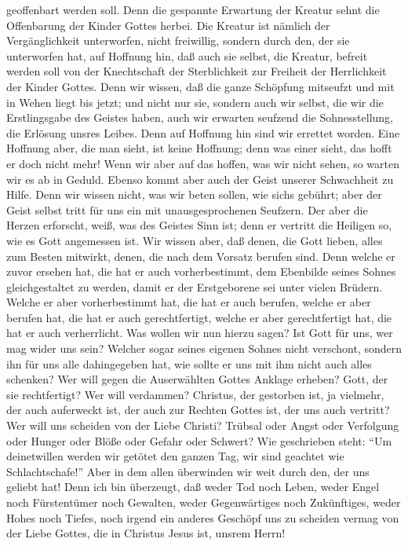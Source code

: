 geoffenbart werden soll.  Denn die gespannte Erwartung
der Kreatur sehnt die Offenbarung der Kinder Gottes herbei.
 Die Kreatur ist nämlich der Vergänglichkeit unterworfen,
nicht freiwillig, sondern durch den, der sie unterworfen hat, auf
Hoffnung hin,  daß auch sie selbst, die Kreatur, befreit
werden soll von der Knechtschaft der Sterblichkeit zur Freiheit der
Herrlichkeit der Kinder Gottes.  Denn wir wissen, daß die
ganze Schöpfung mitseufzt und mit in Wehen liegt bis jetzt;
 und nicht nur sie, sondern auch wir selbst, die wir die
Erstlingsgabe des Geistes haben, auch wir erwarten seufzend die
Sohnesstellung, die Erlösung unsres Leibes.  Denn auf
Hoffnung hin sind wir errettet worden. Eine Hoffnung aber, die man
sieht, ist keine Hoffnung; denn was einer sieht, das hofft er doch nicht
mehr!  Wenn wir aber auf das hoffen, was wir nicht sehen,
so warten wir es ab in Geduld.  Ebenso kommt aber auch
der Geist unserer Schwachheit zu Hilfe. Denn wir wissen nicht, was wir
beten sollen, wie sich\textquotesingle s gebührt; aber der Geist selbst
tritt für uns ein mit unausgesprochenen Seufzern.  Der
aber die Herzen erforscht, weiß, was des Geistes Sinn ist; denn er
vertritt die Heiligen so, wie es Gott angemessen ist. 
Wir wissen aber, daß denen, die Gott lieben, alles zum Besten mitwirkt,
denen, die nach dem Vorsatz berufen sind.  Denn welche er
zuvor ersehen hat, die hat er auch vorherbestimmt, dem Ebenbilde seines
Sohnes gleichgestaltet zu werden, damit er der Erstgeborene sei unter
vielen Brüdern.  Welche er aber vorherbestimmt hat, die
hat er auch berufen, welche er aber berufen hat, die hat er auch
gerechtfertigt, welche er aber gerechtfertigt hat, die hat er auch
verherrlicht.  Was wollen wir nun hierzu sagen? Ist Gott
für uns, wer mag wider uns sein?  Welcher sogar seines
eigenen Sohnes nicht verschont, sondern ihn für uns alle dahingegeben
hat, wie sollte er uns mit ihm nicht auch alles schenken?
 Wer will gegen die Auserwählten Gottes Anklage erheben?
Gott, der sie rechtfertigt?  Wer will verdammen?
Christus, der gestorben ist, ja vielmehr, der auch auferweckt ist, der
auch zur Rechten Gottes ist, der uns auch vertritt?  Wer
will uns scheiden von der Liebe Christi? Trübsal oder Angst oder
Verfolgung oder Hunger oder Blöße oder Gefahr oder Schwert?
 Wie geschrieben steht: ``Um deinetwillen werden wir
getötet den ganzen Tag, wir sind geachtet wie Schlachtschafe!''
 Aber in dem allen überwinden wir weit durch den, der uns
geliebt hat!  Denn ich bin überzeugt, daß weder Tod noch
Leben, weder Engel noch Fürstentümer noch Gewalten, weder Gegenwärtiges
noch Zukünftiges,  weder Hohes noch Tiefes, noch irgend
ein anderes Geschöpf uns zu scheiden vermag von der Liebe Gottes, die in
Christus Jesus ist, unsrem Herrn!

